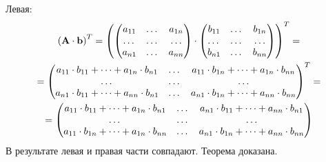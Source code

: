 \documentclass[../../calc-math-exam-2023.tex]{subfiles}
\begin{document}
\begin{theorem}
        Левая:
        \begin{gather*}
            \left( \bf{A} \cdot \bf{b} \right)^T =
            \left(
            \begin{pmatrix}
                a_{11} & \dots & a_{1n} \\
                \dots  & \dots & \dots  \\
                a_{n1} & \dots & a_{nn}
            \end{pmatrix}
            \cdot
            \begin{pmatrix}
                b_{11} & \dots & b_{1n} \\
                \dots  & \dots & \dots  \\
                b_{n1} & \dots & b_{nn}
            \end{pmatrix}
            \right)^T
            = \\
            = \begin{pmatrix}
                  a_{11} \cdot b_{11} + \dots + a_{1n} \cdot b_{n1} & \dots & a_{11} \cdot b_{1n} + \dots + a_{1n} \cdot b_{nn} \\
                  \dots                                             & \dots & \dots                                             \\
                  a_{n1} \cdot b_{11} + \dots + a_{nn} \cdot b_{n1} & \dots & a_{n1} \cdot b_{1n} + \dots + a_{nn} \cdot b_{nn}
            \end{pmatrix}^T = \\
            = \begin{pmatrix}
                  a_{11} \cdot b_{11} + \dots + a_{1n} \cdot b_{n1} & \dots & a_{n1} \cdot b_{11} + \dots + a_{nn} \cdot b_{n1} \\
                  \dots                                             & \dots & \dots                                             \\
                  a_{11} \cdot b_{1n} + \dots + a_{1n} \cdot b_{nn} & \dots & a_{n1} \cdot b_{1n} + \dots + a_{nn} \cdot b_{nn}
            \end{pmatrix}
        \end{gather*}
        В результате левая и правая части совпадают. Теорема доказана.
    \end{theorem}
\end{document}
